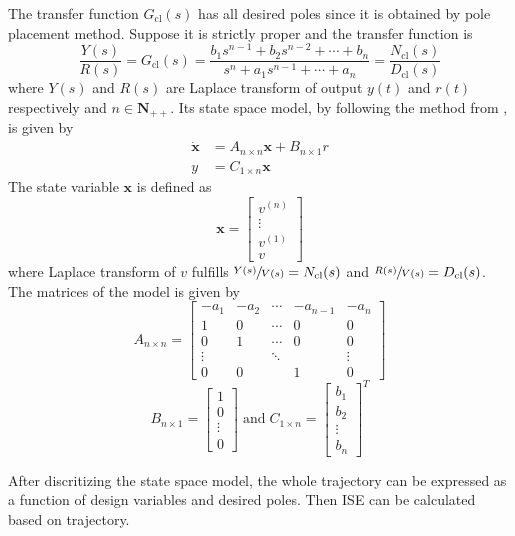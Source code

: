 The transfer function $G_{\text{cl}}(s)$ has all desired poles since it is  obtained by pole placement method. Suppose it is strictly proper and the transfer function is 
$$\frac{Y(s)}{R(s)}=G_{\text{cl}}(s)=\frac{b_1s^{n-1}+b_2s^{n-2}+ \cdots +b_n}{s^n+a_1s^{n-1}+ \cdots + a_n}=\frac{N_\text{cl}(s)}{D_{\text{cl}}(s)}$$ where $Y(s)$ and $R(s)$ are Laplace transform of output $y(t)$ and $r(t)$ respectively and $n \in \mathbf{N_{++}}$. Its state space model, by following the method from \cite{astrom2010feedback}, is given by 
\begin{equation}\label{eq:st_sp}
\begin{aligned} 
\dot{\mathbf{x}}&=A_{n \times n}\mathbf{x}+B_{n \times 1}r\\
y&=C_{1 \times n} \mathbf{x}
\end{aligned} 
\end{equation}
The state variable $\mathbf{x}$ is defined as $$\mathbf{x}=\left[\begin{array}{c}v^{(n)}\\ \vdots \\v^{(1)}\\v \end{array}\right]$$ where Laplace transform of $v$ fulfills $\sfrac{Y(s)}{V(s)}=N_{\text{cl}}(s)$ and $\sfrac{R(s)}{V(s)}=D_{\text{cl}}(s)$. The matrices of the model is given by $$ A_{n \times n} = 
 \left[\begin{array}{ccccc}
  -a_1 & -a_2 & \cdots & -a_{n-1} & -a_n \\
  1 &	0 & \cdots & 0 & 0 \\
  0 &	1 & \cdots & 0 & 0 \\
  \vdots  &   & \ddots & & \vdots  \\
  0 & 0 &  & 1 & 0
 \end{array}\right] $$ $$ B_{n \times 1} = \left[\begin{array}{c}1\\0\\ \vdots \\ 0 \end{array}\right]\; \text{and}\; C_{1 \times n}= \left[\begin{array}{c}b_1\\b_2\\ \vdots \\ b_n \end{array}\right]^T $$
 
After discritizing the state space model, the whole trajectory can be expressed as a function of design variables and desired poles. Then ISE can be calculated based on trajectory.  